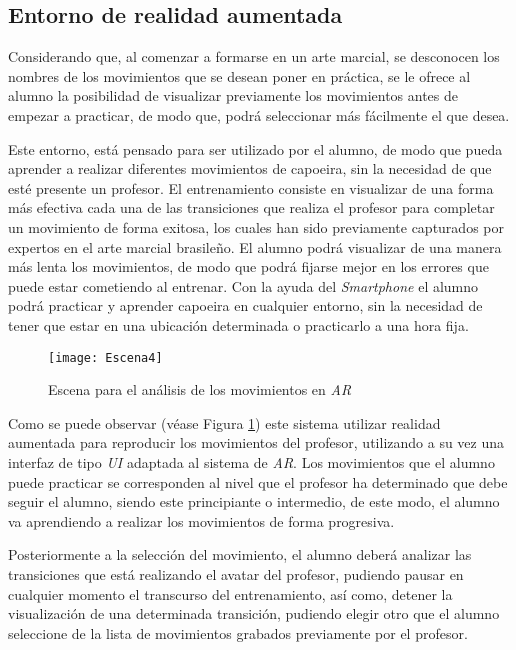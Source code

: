 \subsection{Entorno de realidad aumentada}

Considerando que, al comenzar a formarse en un arte marcial, se desconocen los nombres de los movimientos que se desean poner en práctica, se le ofrece al alumno la posibilidad de visualizar previamente los movimientos antes de empezar a practicar, de modo que, podrá seleccionar más fácilmente el que desea.

Este entorno, está pensado para ser utilizado por el alumno, de modo que pueda aprender a realizar diferentes movimientos de capoeira, sin la necesidad de que esté presente un profesor. El entrenamiento consiste en visualizar de una forma más efectiva cada una de las transiciones que realiza el profesor para completar un movimiento de forma exitosa, los cuales han sido previamente capturados por expertos en el arte marcial brasileño. El alumno podrá visualizar de una manera más lenta los movimientos, de modo que podrá fijarse mejor en los errores que puede estar cometiendo al entrenar. Con la ayuda del \textit{Smartphone} el alumno podrá practicar y aprender capoeira en cualquier entorno, sin la necesidad de tener que estar en una ubicación determinada o practicarlo a una hora fija. 

\begin{figure}[h!]
    \centering 
    \texttt{[image: Escena4]}
    \caption{Escena para el análisis de los movimientos en \textit{AR}}
    \label{fig:Escena4}
\end{figure} 

Como se puede observar (véase Figura \ref{fig:Escena4}) este sistema utilizar realidad aumentada para reproducir los movimientos del profesor, utilizando a su vez una interfaz de tipo \textit{UI} adaptada al sistema de \textit{AR}. Los movimientos que el alumno puede practicar se corresponden al nivel que el profesor ha determinado que debe seguir el alumno, siendo este principiante o intermedio, de este modo, el alumno va aprendiendo a realizar los movimientos de forma progresiva.

Posteriormente a la selección del movimiento, el alumno deberá analizar las transiciones que está realizando el avatar del profesor, pudiendo pausar en cualquier momento el transcurso del entrenamiento, así como, detener la visualización de una determinada transición, pudiendo elegir otro que el alumno seleccione de la lista de movimientos grabados previamente por el profesor. 


